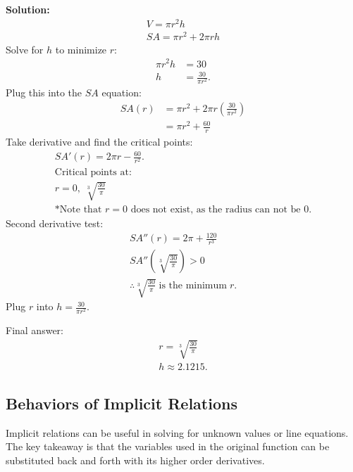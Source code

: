 \documentclass[12pt]{article}
\begin{document}
\begin{enumerate}
	      \noindent \textbf{Solution:}
	      \begin{gather*}
		      V = \pi r^2 h \\
		      SA = \pi r^2 + 2\pi rh
	      \end{gather*}
	      Solve for $h$ to minimize $r$:
	      \begin{align*}
		      \pi r^2 h & = 30                  \\
		      h         & = \frac{30}{\pi r^2}.
	      \end{align*}
	      Plug this into the $SA$ equation:
	      \begin{align*}
		      SA(r) & = \pi r^2 + 2\pi r \left( \frac{30}{\pi r^2} \right) \\[6pt]
		      & = \pi r^2 + \frac{60}{r}
	      \end{align*}
	      Take derivative and find the critical points:
	      \begin{gather*}
		      SA'(r) = 2 \pi r - \frac{60}{r^2}. \\[6pt]
		      \text{Critical points at:} \\
		      r = 0, \; \sqrt[3]{\frac{30}{\pi}} \\[6pt]
		      \text{*Note that $r=0$ does not exist, as the radius can not be $0$.}
	      \end{gather*}
	      Second derivative test:
	      \begin{gather*}
		      SA''(r) = 2 \pi + \frac{120}{r^3} \\[6pt]
		      SA'' \left( \sqrt[3]{\frac{30}{\pi}} \right) > 0 \\[6pt]
		      \therefore \sqrt[3]{\frac{30}{\pi}} \; \text{is the minimum} \; r.
	      \end{gather*}
	      Plug $r$ into $h=\frac{30}{\pi r^2}$.

	      \noindent Final answer:
	      \begin{gather*}
		      r = \sqrt[3]{\frac{30}{\pi}} \\[6pt]
		      h \approx 2.1215.
	      \end{gather*}
\end{enumerate}

\subsection{Behaviors of Implicit Relations} %
Implicit relations can be useful in solving for unknown values or line equations. The key takeaway is that the variables used in the original function can be substituted back and forth with its higher order derivatives.
\end{document}
